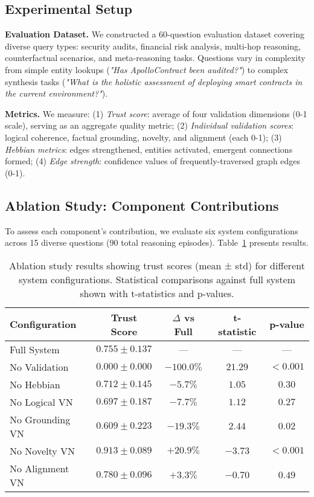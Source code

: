 \documentclass{article}
\begin{document}
\subsection{Experimental Setup}

\textbf{Evaluation Dataset.} We constructed a 60-question evaluation dataset covering diverse query types: security audits, financial risk analysis, multi-hop reasoning, counterfactual scenarios, and meta-reasoning tasks. Questions vary in complexity from simple entity lookups (\textit{"Has ApolloContract been audited?"}) to complex synthesis tasks (\textit{"What is the holistic assessment of deploying smart contracts in the current environment?"}).

\textbf{Metrics.} We measure: (1) \textit{Trust score}: average of four validation dimensions (0-1 scale), serving as an aggregate quality metric; (2) \textit{Individual validation scores}: logical coherence, factual grounding, novelty, and alignment (each 0-1); (3) \textit{Hebbian metrics}: edges strengthened, entities activated, emergent connections formed; (4) \textit{Edge strength}: confidence values of frequently-traversed graph edges (0-1).

\subsection{Ablation Study: Component Contributions}

To assess each component's contribution, we evaluate six system configurations across 15 diverse questions (90 total reasoning episodes). Table~\ref{tab:ablation} presents results.

\begin{table}[h]
\centering
\caption{Ablation study results showing trust scores (mean ± std) for different system configurations. Statistical comparisons against full system shown with t-statistics and p-values.}
\label{tab:ablation}
\begin{tabular}{lcccc}
\toprule
\textbf{Configuration} & \textbf{Trust Score} & \textbf{$\Delta$ vs Full} & \textbf{t-statistic} & \textbf{p-value} \\
\midrule
Full System & $0.755 \pm 0.137$ & --- & --- & --- \\
No Validation & $0.000 \pm 0.000$ & $-100.0\%$ & $21.29$ & $< 0.001$ \\
No Hebbian & $0.712 \pm 0.145$ & $-5.7\%$ & $1.05$ & $0.30$ \\
No Logical VN & $0.697 \pm 0.187$ & $-7.7\%$ & $1.12$ & $0.27$ \\
No Grounding VN & $0.609 \pm 0.223$ & $-19.3\%$ & $2.44$ & $0.02$ \\
No Novelty VN & $0.913 \pm 0.089$ & $+20.9\%$ & $-3.73$ & $< 0.001$ \\
No Alignment VN & $0.780 \pm 0.096$ & $+3.3\%$ & $-0.70$ & $0.49$ \\
\bottomrule
\end{tabular}
\end{table}
\end{document}
